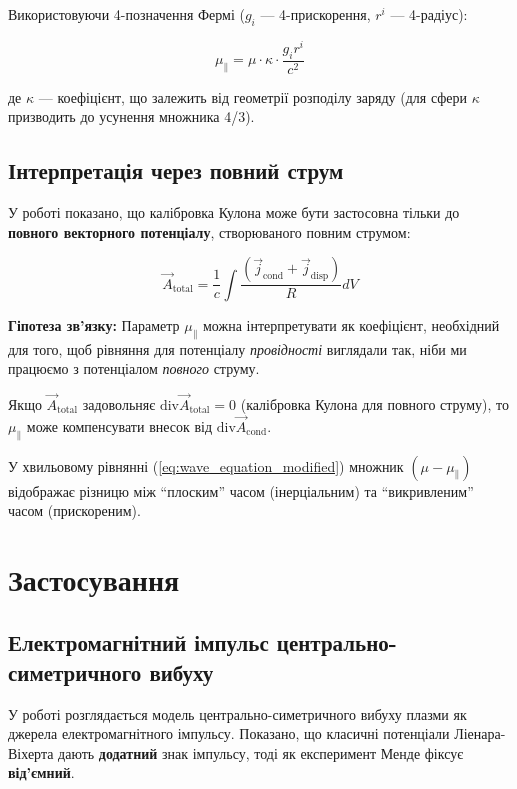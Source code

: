 \documentclass[12pt, a4paper]{article}
\begin{document}
Використовуючи 4-позначення Фермі ($g_i$ --- 4-прискорення, $r^i$ --- 4-радіус):

\begin{equation}
\mu_{\parallel} = \mu \cdot \kappa \cdot \frac{g_i r^i}{c^2}
\label{eq:mu_parallel_4vector}
\end{equation}

де $\kappa$ --- коефіцієнт, що залежить від геометрії розподілу заряду (для сфери $\kappa$ призводить до усунення множника 4/3).

\subsection{Інтерпретація через повний струм}

У роботі \cite{CoulombCalib} показано, що калібровка Кулона може бути застосовна тільки до \textbf{повного векторного потенціалу}, створюваного повним струмом:

\begin{equation}
\vec{A}_{\text{total}} = \frac{1}{c} \int \frac{(\vec{j}_{\text{cond}} + \vec{j}_{\text{disp}})}{R} dV
\label{eq:total_potential_again}
\end{equation}

\textbf{Гіпотеза зв'язку:} Параметр $\mu_{\parallel}$ можна інтерпретувати як коефіцієнт, необхідний для того, щоб рівняння для потенціалу \textit{провідності} виглядали так, ніби ми працюємо з потенціалом \textit{повного} струму.

Якщо $\vec{A}_{\text{total}}$ задовольняє $\text{div} \vec{A}_{\text{total}} = 0$ (калібровка Кулона для повного струму), то $\mu_{\parallel}$ може компенсувати внесок від $\text{div} \vec{A}_{\text{cond}}$.

У хвильовому рівнянні (\ref{eq:wave_equation_modified}) множник $(\mu - \mu_{\parallel})$ відображає різницю між ``плоским'' часом (інерціальним) та ``викривленим'' часом (прискореним).

\section{Застосування}

\subsection{Електромагнітний імпульс центрально-симетричного вибуху}

У роботі \cite{PlasmaExplosion} розглядається модель центрально-симетричного вибуху плазми як джерела електромагнітного імпульсу. Показано, що класичні потенціали Ліенара-Віхерта дають \textbf{додатний} знак імпульсу, тоді як експеримент Менде фіксує \textbf{від'ємний}.
\end{document}
